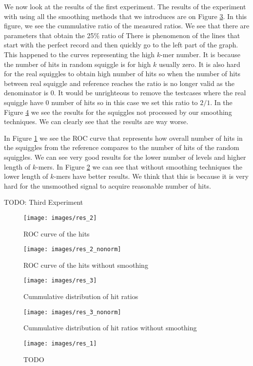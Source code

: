 We now look at the results of the first experiment. The results of the experiment
with using all the smoothing methods that we introduces are on Figure \ref{obr:res_3}.
In this figure, we see the cummulative ratio of the measured ratios.
We see that there are parameters that obtain the 25\% ratio of 
There is phenomenon of the lines that start with the perfect record and then quickly
go to the left part of the graph. This happened to the curves representing
the high $k$-mer number. It is because the number of hits in random squiggle is for
high $k$ usually zero. It is also hard for the real squiggles to obtain
high number of hits so when the number of hits between real squiggle and reference reaches
the ratio is no longer valid as the denominator is 0. It would be unrighteous to
remove the testcases where the real squiggle have 0 number of hits so in this case
we set this ratio to $2/1$.
In the Figure \ref{obr:res_3_nonorm} we see the results for the squiggles not processed
by our smoothing techniques. We can clearly see that the results are way worse.

In Figure \ref{obr:res_2} we see the ROC curve that represents how overall number
of hits in the squiggles from the reference compares to the number of hits of the
random squiggles. We can see very good results for the lower number of levels and higher
length of $k$-mers. In Figure \ref{obr:res_2_nonorm} we can see that without smoothing
techniques the lower length of $k$-mers have better results. We think that this is
because it is very hard for the unsmoothed signal to acquire reasonable number of hits.

TODO: Third Experiment

\begin{figure}
\centerline{\texttt{[image: images/res\_2]}}
\caption[TODO]{ROC curve of the hits}
\label{obr:res_2}
\end{figure}

\begin{figure}
\centerline{\texttt{[image: images/res\_2\_nonorm]}}
\caption[TODO]{ROC curve of the hits without smoothing}
\label{obr:res_2_nonorm}
\end{figure}

\begin{figure}
\centerline{\texttt{[image: images/res\_3]}}
\caption[TODO]{Cummulative distribution of hit ratios}
\label{obr:res_3}
\end{figure}

\begin{figure}
\centerline{\texttt{[image: images/res\_3\_nonorm]}}
\caption[TODO]{Cummulative distribution of hit ratios without smoothing}
\label{obr:res_3_nonorm}
\end{figure}

\begin{figure}
\centerline{\texttt{[image: images/res\_1]}}
\caption[TODO]{TODO}
\label{obr:res_1}
\end{figure}
